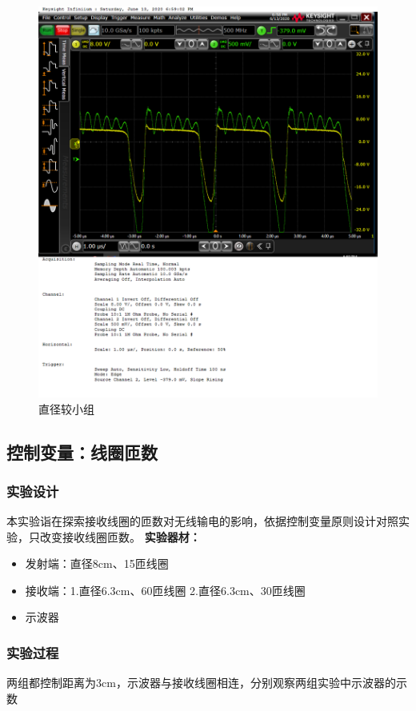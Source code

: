 \documentclass[conference]{IEEEtran}
\theoremstyle{break}
\begin{document}
\begin{figure}[htbp]
        \centerline{\includegraphics[scale=0.1]{z2.png}}
        \caption{直径较小组}
        \label{fig}
        \end{figure}   
\subsection{控制变量：线圈匝数}
\subsubsection{实验设计}
本实验诣在探索接收线圈的匝数对无线输电的影响，依据控制变量原则设计对照实验，只改变接收线圈匝数。
\textbf{实验器材：}
\begin{itemize}
\item 发射端：直径8cm、15匝线圈
\item 接收端：1.直径6.3cm、60匝线圈  2.直径6.3cm、30匝线圈
\item 示波器
\end{itemize}
\subsubsection{实验过程}
两组都控制距离为3cm，示波器与接收线圈相连，分别观察两组实验中示波器的示数       
\end{document}

